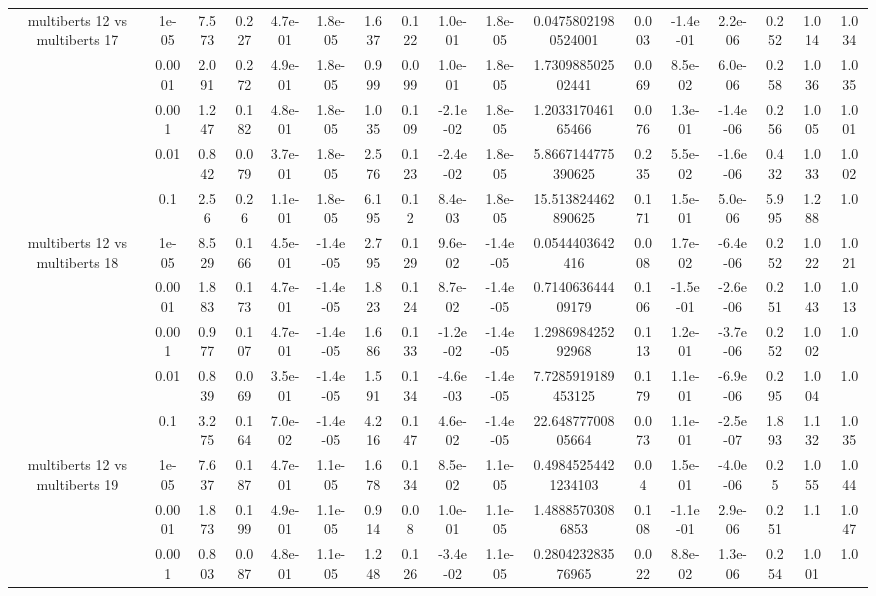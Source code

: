 \begin{tabular}{|c|c|c|c|c|c|c|c|c|c|c|c|c|c|c|c|c|}
\hline
\multirow{5}{*}{multiberts 12 vs multiberts 17} & 1e-05 & 7.573 & 0.227 & 4.7e-01 & 1.8e-05 & 1.637 & 0.122 & 1.0e-01 & 1.8e-05 & 0.04758021980524001 & 0.003 & -1.4e-01 & 2.2e-06 & 0.252 & 1.014 & 1.034 \\
 & 0.0001 & 2.091 & 0.272 & 4.9e-01 & 1.8e-05 & 0.999 & 0.099 & 1.0e-01 & 1.8e-05 & 1.730988502502441 & 0.069 & 8.5e-02 & 6.0e-06 & 0.258 & 1.036 & 1.035 \\
 & 0.001 & 1.247 & 0.182 & 4.8e-01 & 1.8e-05 & 1.035 & 0.109 & -2.1e-02 & 1.8e-05 & 1.203317046165466 & 0.076 & 1.3e-01 & -1.4e-06 & 0.256 & 1.005 & 1.001 \\
 & 0.01 & 0.842 & 0.079 & 3.7e-01 & 1.8e-05 & 2.576 & 0.123 & -2.4e-02 & 1.8e-05 & 5.8667144775390625 & 0.235 & 5.5e-02 & -1.6e-06 & 0.432 & 1.033 & 1.002 \\
 & 0.1 & 2.56 & 0.26 & 1.1e-01 & 1.8e-05 & 6.195 & 0.12 & 8.4e-03 & 1.8e-05 & 15.513824462890625 & 0.171 & 1.5e-01 & 5.0e-06 & 5.995 & 1.288 & 1.0 \\
\hline
\multirow{5}{*}{multiberts 12 vs multiberts 18} & 1e-05 & 8.529 & 0.166 & 4.5e-01 & -1.4e-05 & 2.795 & 0.129 & 9.6e-02 & -1.4e-05 & 0.0544403642416 & 0.008 & 1.7e-02 & -6.4e-06 & 0.252 & 1.022 & 1.021 \\
 & 0.0001 & 1.883 & 0.173 & 4.7e-01 & -1.4e-05 & 1.823 & 0.124 & 8.7e-02 & -1.4e-05 & 0.714063644409179 & 0.106 & -1.5e-01 & -2.6e-06 & 0.251 & 1.043 & 1.013 \\
 & 0.001 & 0.977 & 0.107 & 4.7e-01 & -1.4e-05 & 1.686 & 0.133 & -1.2e-02 & -1.4e-05 & 1.298698425292968 & 0.113 & 1.2e-01 & -3.7e-06 & 0.252 & 1.002 & 1.0 \\
 & 0.01 & 0.839 & 0.069 & 3.5e-01 & -1.4e-05 & 1.591 & 0.134 & -4.6e-03 & -1.4e-05 & 7.7285919189453125 & 0.179 & 1.1e-01 & -6.9e-06 & 0.295 & 1.004 & 1.0 \\
 & 0.1 & 3.275 & 0.164 & 7.0e-02 & -1.4e-05 & 4.216 & 0.147 & 4.6e-02 & -1.4e-05 & 22.64877700805664 & 0.073 & 1.1e-01 & -2.5e-07 & 1.893 & 1.132 & 1.035 \\
\hline
\multirow{5}{*}{multiberts 12 vs multiberts 19} & 1e-05 & 7.637 & 0.187 & 4.7e-01 & 1.1e-05 & 1.678 & 0.134 & 8.5e-02 & 1.1e-05 & 0.49845254421234103 & 0.04 & 1.5e-01 & -4.0e-06 & 0.25 & 1.055 & 1.044 \\
 & 0.0001 & 1.873 & 0.199 & 4.9e-01 & 1.1e-05 & 0.914 & 0.08 & 1.0e-01 & 1.1e-05 & 1.48885703086853 & 0.108 & -1.1e-01 & 2.9e-06 & 0.251 & 1.1 & 1.047 \\
 & 0.001 & 0.803 & 0.087 & 4.8e-01 & 1.1e-05 & 1.248 & 0.126 & -3.4e-02 & 1.1e-05 & 0.280423283576965 & 0.022 & 8.8e-02 & 1.3e-06 & 0.254 & 1.001 & 1.0 \\

\end{tabular}
